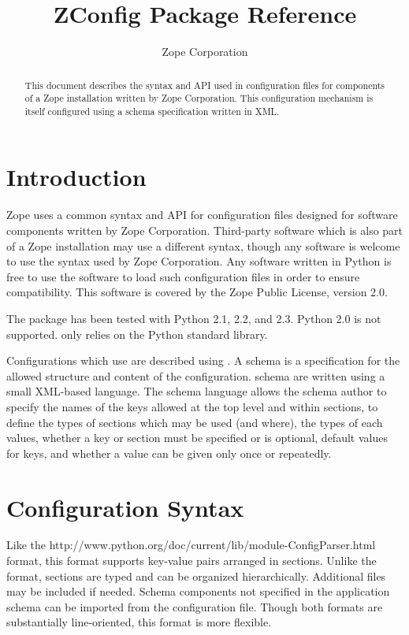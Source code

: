 \documentclass{howto}
\title{ZConfig Package Reference}
\author{Zope Corporation}
\begin{document}
\maketitle

\begin{abstract}
\noindent
This document describes the syntax and API used in configuration files
for components of a Zope installation written by Zope Corporation.  This
configuration mechanism is itself configured using a schema specification
written in XML.
\end{abstract}

\tableofcontents


\section{Introduction \label{intro}}

Zope uses a common syntax and API for configuration files designed for
software components written by Zope Corporation.  Third-party software
which is also part of a Zope installation may use a different syntax,
though any software is welcome to use the syntax used by Zope
Corporation.  Any software written in Python is free to use the
 software to load such configuration files in order to
ensure compatibility.  This software is covered by the Zope Public
License, version 2.0.

The  package has been tested with Python 2.1, 2.2, and
2.3.  Python 2.0 is not supported.
 only relies on the Python standard library.

Configurations which use  are described using
.  A schema is a specification for the allowed structure
and content of the configuration.   schema are written
using a small XML-based language.  The schema language allows the
schema author to specify the names of the keys allowed at the top
level and within sections, to define the types of sections which may
be used (and where), the types of each values, whether a key or
section must be specified or is optional, default values for keys, and
whether a value can be given only once or repeatedly.


\section{Configuration Syntax \label{syntax}}

Like the 
{http://www.python.org/doc/current/lib/module-ConfigParser.html}
format, this format supports key-value pairs arranged in sections.
Unlike the  format, sections are typed and can be
organized hierarchically.
Additional files may be included if needed.  Schema components not
specified in the application schema can be imported from the
configuration file.  Though both formats are substantially
line-oriented, this format is more flexible.
\end{document}
